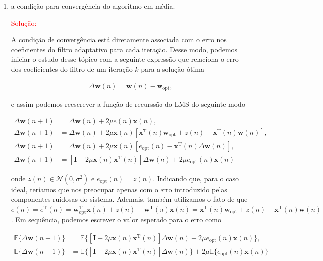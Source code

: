 \begin{enumerate}
    
    \item a condição para convergência do algoritmo em média.
    
        \textcolor{red}{Solução:}
        
        A condição de convergência está diretamente associada com o erro nos coeficientes do filtro adaptativo para cada iteração.
        Desse modo, podemos iniciar o estudo desse tópico com a seguinte expressão que relaciona o erro dos coeficientes do filtro de um iteração
        $k$ para a solução ótima
        
        \begin{align}
            \Delta \mathbf{w}(n) = \mathbf{w}(n) - \mathbf{w}_{\text{opt}},
        \end{align}

        e assim podemos reescrever a função de recurssão do LMS do seguinte modo

        \begin{align}
            \Delta \mathbf{w}(n + 1) &= \Delta \mathbf{w}(n) + 2 \mu e(n) \mathbf{x}(n), \\
            \Delta \mathbf{w}(n + 1) &= \Delta \mathbf{w}(n) + 2 \mu \mathbf{x}(n) \left[\mathbf{x}^{\text{T}}(n)\mathbf{w}_{\text{opt}} + z(n) - \mathbf{x}^{\text{T}}(n)\mathbf{w}(n)\right], \\
            \Delta \mathbf{w}(n + 1) &= \Delta \mathbf{w}(n) + 2 \mu \mathbf{x}(n) \left[e_{\text{opt}}(n) - \mathbf{x}^{\text{T}}(n) \Delta \mathbf{w}(n)\right], \\
            \Delta \mathbf{w}(n + 1) &= \left[ \mathbf{I} - 2 \mu \mathbf{x}(n) \mathbf{x}^{\text{T}}(n) \right] \Delta \mathbf{w}(n) + 2 \mu e_{\text{opt}}(n) \mathbf{x}(n)
        \end{align}
    
        onde $z(n) \in \mathcal{N}(0,\sigma^{2})$ e $e_{\text{opt}}(n) = z(n)$. Indicando que, para o caso ideal, teríamos que nos preocupar apenas com o erro introduzido pelas componentes ruidosas do sistema.
        Ademais, também utilizamos o fato de que $e(n) = e^{\text{T}}(n) = \mathbf{w}^{\text{T}}_{\text{opt}}\mathbf{x}(n) + z(n) - \mathbf{w}^{\text{T}}(n)\mathbf{x}(n) = \mathbf{x}^{\text{T}}(n)\mathbf{w}_{\text{opt}} + z(n) - \mathbf{x}^{\text{T}}(n)\mathbf{w}(n)$.
        Em sequência, podemos escrever o valor esperado para o erro como

        \begin{align}
            \mathbb{E}\{\Delta \mathbf{w}(n + 1)\} &= \mathbb{E}\{\left[ \mathbf{I} - 2 \mu \mathbf{x}(n) \mathbf{x}^{\text{T}}(n) \right] \Delta \mathbf{w}(n) + 2 \mu e_{\text{opt}}(n) \mathbf{x}(n)\}, \\
            \mathbb{E}\{\Delta \mathbf{w}(n + 1)\} &= \mathbb{E}\{\left[ \mathbf{I} - 2 \mu \mathbf{x}(n) \mathbf{x}^{\text{T}}(n) \right] \Delta \mathbf{w}(n)\} + 2 \mu \mathbb{E}\{e_{\text{opt}}(n) \mathbf{x}(n)\}
        \end{align}
        

\end{enumerate}
